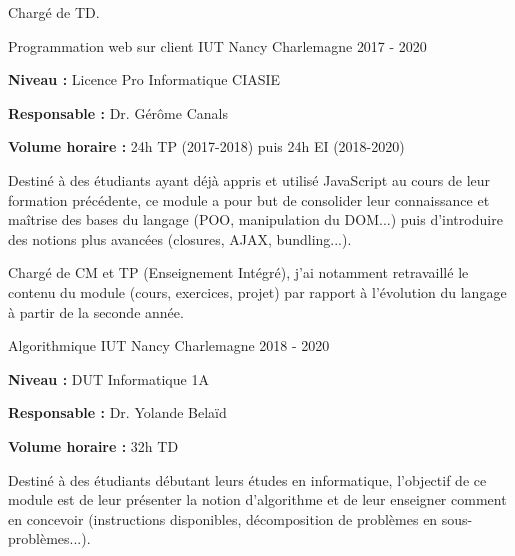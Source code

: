 \documentclass[12pt, a4paper]{awesome-cv}
\begin{document}
\begin{cventries}
  \begin{cvparagraph}
    Chargé de TD.
  \end{cvparagraph}

  \cventry
  {Programmation web sur client} %
  {IUT Nancy Charlemagne} %
  {} %
  {2017 - 2020} %
  {
    \begin{cvitems}
      \item {\textbf{Niveau : } Licence Pro Informatique CIASIE}
      \item {\textbf{Responsable : } Dr. Gérôme Canals}
      \item {\textbf{Volume horaire : } 24h TP (2017-2018) puis 24h EI (2018-2020)}
    \end{cvitems}
  }

  \begin{cvparagraph}
    Destiné à des étudiants ayant déjà appris et utilisé JavaScript au cours de leur formation précédente, ce module a pour but de consolider leur connaissance et maîtrise des bases du langage (POO, manipulation du DOM...) puis d'introduire des notions plus avancées (closures, AJAX, bundling...).
  \end{cvparagraph}

  \begin{cvparagraph}
    Chargé de CM et TP (Enseignement Intégré), j'ai notamment retravaillé le contenu du module (cours, exercices, projet) par rapport à l'évolution du langage à partir de la seconde année.
  \end{cvparagraph}

  \cventry
  {Algorithmique} %
  {IUT Nancy Charlemagne} %
  {} %
  {2018 - 2020} %
  {
    \begin{cvitems}
      \item {\textbf{Niveau : } DUT Informatique 1A}
      \item {\textbf{Responsable : } Dr. Yolande Belaïd}
      \item {\textbf{Volume horaire : } 32h TD}
    \end{cvitems}
  }

  \begin{cvparagraph}
    Destiné à des étudiants débutant leurs études en informatique, l'objectif de ce module est de leur présenter la notion d'algorithme et de leur enseigner comment en concevoir (instructions disponibles, décomposition de problèmes en sous-problèmes...).
  \end{cvparagraph}


\end{cventries}
\end{document}
